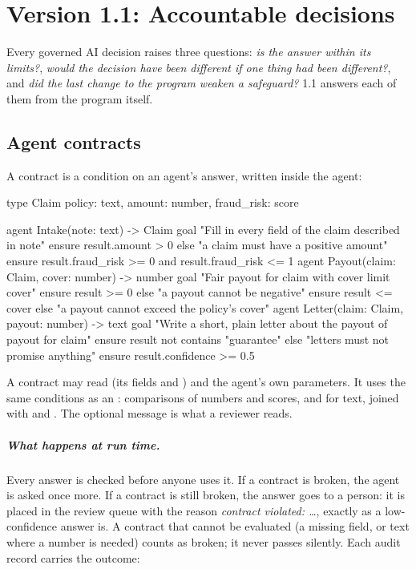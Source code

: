 \chapter{Version 1.1: Accountable decisions}
\label{ch:v11}

Every governed AI decision raises three questions: \emph{is the answer within its limits?}, \emph{would the decision have been different if one thing had been different?}, and \emph{did the last change to the program weaken a safeguard?} \algolang{} 1.1 answers each of them from the program itself.

\section{Agent contracts}

A contract is a condition on an agent's answer, written inside the agent:

\begin{algo}[title=examples/v11/claim\_contracts.algo (excerpt)]
type Claim { policy: text, amount: number, fraud_risk: score }

agent Intake(note: text) -> Claim {
    goal   "Fill in every field of the claim described in {note}"
    ensure result.amount > 0 else "a claim must have a positive amount"
    ensure result.fraud_risk >= 0 and result.fraud_risk <= 1
}
agent Payout(claim: Claim, cover: number) -> number {
    goal   "Fair payout for {claim} with cover limit {cover}"
    ensure result >= 0     else "a payout cannot be negative"
    ensure result <= cover else "a payout cannot exceed the policy's cover"
}
agent Letter(claim: Claim, payout: number) -> text {
    goal   "Write a short, plain letter about the payout of {payout} for {claim}"
    ensure result not contains "guarantee" else "letters must not promise anything"
    ensure result.confidence >= 0.5
}
\end{algo}

A contract may read  (its fields and ) and the agent's own parameters. It uses the same conditions as an : comparisons of numbers and scores,  and  for text, joined with  and . The optional  message is what a reviewer reads.

\paragraph{What happens at run time.} Every answer is checked before anyone uses it. If a contract is broken, the agent is asked once more. If a contract is still broken, the answer goes to a person: it is placed in the review queue with the reason \emph{contract violated: \ldots}, exactly as a low-confidence answer is. A contract that cannot be evaluated (a missing field, or text where a number is needed) counts as broken; it never passes silently. Each audit record carries the outcome:

